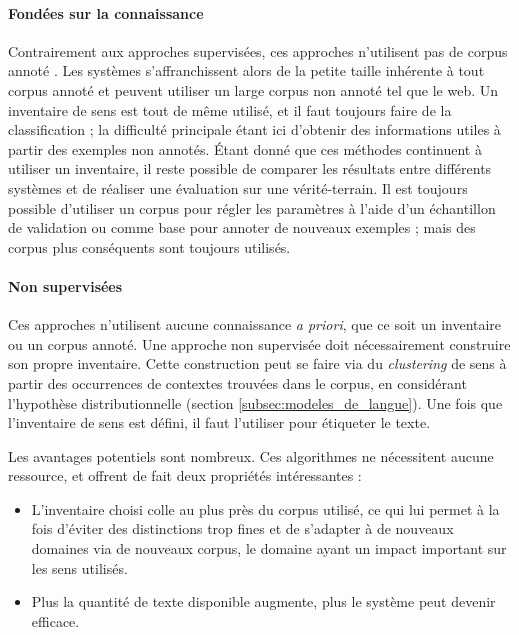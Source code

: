 \paragraph{Fondées sur la connaissance}

Contrairement aux approches supervisées, ces approches n'utilisent pas de
corpus annoté \citep{swier2005exploiting,pradet2013revisiting}. Les systèmes
s'affranchissent alors de la petite taille inhérente à tout corpus annoté et
peuvent utiliser un large corpus non annoté tel que le web. Un inventaire de
sens est tout de même utilisé, et il faut toujours faire de la classification ;
la difficulté principale étant ici d'obtenir des informations utiles à partir
des exemples non annotés. Étant donné que ces méthodes continuent à utiliser un
inventaire, il reste possible de comparer les résultats entre différents
systèmes et de réaliser une évaluation sur une vérité-terrain. Il est toujours
possible d'utiliser un corpus pour régler les paramètres à l'aide d'un
échantillon de validation ou comme base pour annoter de nouveaux exemples ;
mais des corpus plus conséquents sont toujours utilisés.

\paragraph{Non supervisées}

Ces approches n'utilisent aucune connaissance \textit{a priori}, que ce soit un
inventaire ou un corpus annoté. Une approche non supervisée doit nécessairement
construire son propre inventaire. Cette construction peut se faire via du
\textit{clustering} de sens à partir des occurrences de contextes trouvées dans
le corpus, en considérant l'hypothèse distributionnelle (section
\ref{subsec:modeles_de_langue}). Une fois que l'inventaire de sens est défini, il
faut l'utiliser pour étiqueter le texte.

Les avantages potentiels sont nombreux. Ces algorithmes ne nécessitent aucune
ressource, et offrent de fait deux propriétés intéressantes :

\begin{itemize}

    \item L'inventaire choisi colle au plus près du corpus utilisé, ce qui lui
        permet à la fois d'éviter des distinctions trop fines et de s'adapter à
        de nouveaux domaines via de nouveaux corpus, le domaine ayant un impact
        important sur les sens utilisés.

    \item Plus la quantité de texte disponible augmente, plus le système peut
        devenir efficace.

\end{itemize}

